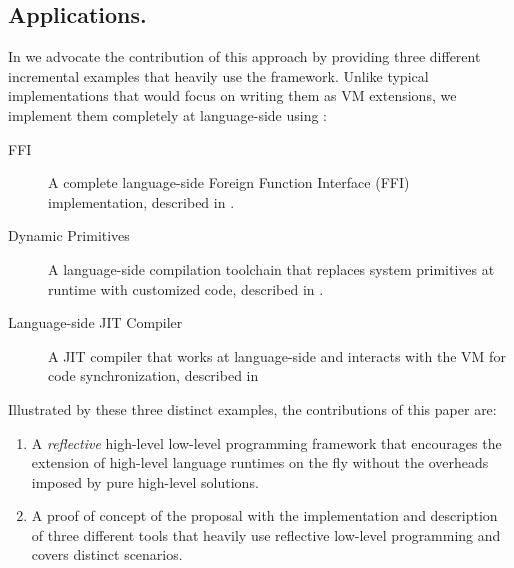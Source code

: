 \subsection{\B Applications.}
In  we advocate the contribution of this approach by providing three different incremental examples that heavily use the framework.
Unlike typical implementations that would focus on writing them as VM extensions, we implement them completely at language-side using \B:

\begin{description}
	\item[FFI] A complete language-side Foreign Function Interface (FFI) implementation, described in .
	\item[Dynamic Primitives] A language-side compilation toolchain that replaces system primitives at runtime with customized code, described in . 
	\item[Language-side JIT Compiler] A JIT compiler that works at language-side and interacts with the VM for code synchronization, described in 
\end{description}


\noindent Illustrated by these three distinct examples, the contributions of this paper are:
\begin{enumerate} 
	\item A \emph{reflective} high-level low-level programming framework that encourages the extension of high-level language runtimes on the fly without the overheads imposed by pure high-level solutions. 
	\item A proof of concept of the proposal with the implementation and description of three different tools that heavily use reflective low-level programming and covers distinct scenarios.
\end{enumerate}




